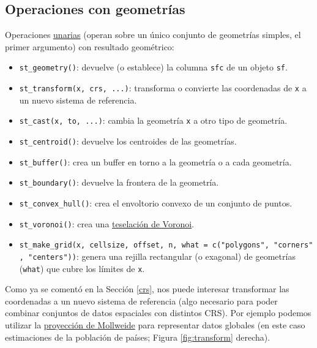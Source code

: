 \documentclass[
  spanish,
]{book}
\providecommand{\tightlist}{%
  \setlength{\itemsep}{0pt}\setlength{\parskip}{0pt}}
\theoremstyle{break}
\theoremstyle{definition}
\theoremstyle{definition}
\theoremstyle{definition}
\theoremstyle{definition}
\theoremstyle{remark}
\begin{document}
\hypertarget{operaciones-con-geometruxedas}{%
\subsection{Operaciones con geometrías}\label{operaciones-con-geometruxedas}}

Operaciones \href{https://r-spatial.github.io/sf/reference/geos_unary.html}{unarias} (operan sobre un único conjunto de geometrías simples, el primer argumento) con resultado geométrico:

\begin{itemize}
\tightlist
\item
  \texttt{st\_geometry()}: devuelve (o establece) la columna \texttt{sfc} de un objeto \texttt{sf}.
\item
  \texttt{st\_transform(x,\ crs,\ ...)}: transforma o convierte las coordenadas de \texttt{x} a un nuevo sistema de referencia.
\item
  \texttt{st\_cast(x,\ to,\ ...)}: cambia la geometría \texttt{x} a otro tipo de geometría.
\item
  \texttt{st\_centroid()}: devuelve los centroides de las geometrías.
\item
  \texttt{st\_buffer()}: crea un buffer en torno a la geometría o a cada geometría.
\item
  \texttt{st\_boundary()}: devuelve la frontera de la geometría.
\item
  \texttt{st\_convex\_hull()}: crea el envoltorio convexo de un conjunto de puntos.
\item
  \texttt{st\_voronoi()}: crea una \href{https://en.wikipedia.org/wiki/Voronoi_diagram}{teselación de Voronoi}.
\item
  \texttt{st\_make\_grid(x,\ cellsize,\ offset,\ n,\ what\ =\ c("polygons",\ "corners",\ "centers"))}: genera una rejilla rectangular (o exagonal) de geometrías (\texttt{what}) que cubre los límites de \texttt{x}.
\end{itemize}

Como ya se comentó en la Sección \ref{crs}, nos puede interesar transformar las coordenadas a un nuevo sistema de referencia (algo necesario para poder combinar conjuntos de datos espaciales con distintos CRS).
Por ejemplo podemos utilizar la \href{https://en.wikipedia.org/wiki/Mollweide_projection}{proyección de Mollweide} para representar datos globales (en este caso estimaciones de la población de países; Figura \ref{fig:transform} derecha).
\end{document}
